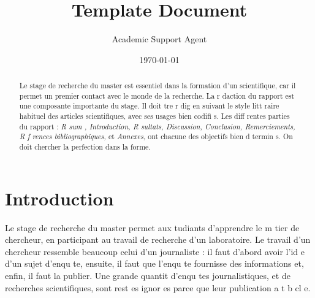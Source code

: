 \documentclass{article}
\title{Template Document}
\author{Academic Support Agent}
\date{\today}
\begin{document}
\maketitle

\checkyears

\vspace*{5mm}




\def\author{Albert Tarantola}
\def\title{Le Rapport de Stage de Master}
\def\shorttitle{Rapport de stage}
\def\unit{IPGP}
\def\team{G omagn tisme \& Sismologie}
\def\spe{G ophysique ou autre} %
\def\supervisor{A. Fournier \& G. Moguilny}
\def\mydate{\today}
\def\keywords{Sciences de la Terre,  master, rapport, conseils}

\Entete


\begin{abstract}
Le stage de recherche du master est essentiel dans la formation d'un scientifique, 
car il permet un premier contact avec le monde de la recherche. 
La r daction du rapport est une composante importante du stage.
Il doit  tre r dig  en suivant le style litt raire habituel des articles 
scientifiques, avec ses usages bien codifi s. 
Les diff rentes parties du rapport : 
\emph{R sum , Introduction, R sultats, Discussion, Conclusion, Remerciements, 
R f rences bibliographiques,\/} et \emph{Annexes,\/} 
ont chacune des objectifs bien d \-ter\-mi\-n s. 
On doit chercher la perfection dans la forme.
\end{abstract}

\newpage

\newpage

\section{Introduction}

Le stage de recherche du master permet aux  tudiants d'apprendre le m tier 
de chercheur, en participant au travail de recherche d'un laboratoire. 
Le travail d'un chercheur ressemble beaucoup   celui d'un journaliste : 
il faut d'abord avoir l'id e d'un sujet d'enqu te, ensuite, il faut que 
l'enqu te fournisse des informations et, enfin, il faut la publier. 
Une grande quantit  d'enqu tes journalistiques, et de recherches 
scientifiques, sont rest es ignor es parce que leur publication a  t  
b cl e.
\end{document}
